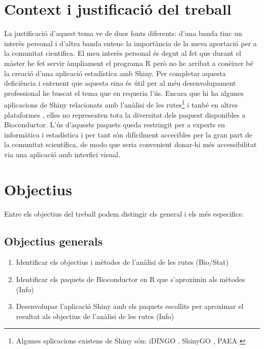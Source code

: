 \section{Context i justificació del treball}
La justificació d'aquest tema ve de dues fonts diferents: d'una banda tinc un interès personal i d'altra banda entenc la importància de la meva aportació per a la comunitat científica. El meu interès personal és degut al fet que durant el màster he fet servir àmpliament el programa R però no he arribat a conèixer bé la creació d'una aplicació estadística amb Shiny. Per completar aquesta deficiència i entenent que aquesta eina és útil per al méu desenvolupament professional he buscat el tema que en requeria l'ús. Encara que hi ha algunes aplicacions de Shiny relacionats amb l'anàlisi de les rutes\footnote{Algunes splicacions existens de Shiny són: iDINGO \cite{class2017idingo}, ShinyGO \cite{ge2018shinygo}, PAEA \cite{clark2015principle}} i tanbé en altres plataformes \cite{reimand2019pathway}, elles no representen tota la diversitat dels paquest disponibles a Bioconductor. L'ús d'aquests paquets queda restringit per a experts en informàtica i estadística i per tant són difícilment accecibles per la gran part de la comunitat scientífica, de modo que seria convenient donar-hi més accessibilitat via una aplicació amb interfici visual. 


\section{Objectius}

Entre els objectius del treball podem distingir els general i els més especifics:
 
\subsection{Objectius generals}
\begin{enumerate}
\item Identificar els objectius i mètodes de l'anàlisi de les rutes (Bio/Stat)
\item Identificar els paquets de Bioconductor en R que s'aproximin als mètodes (Info)
\item Desenvolupar l'aplicació Shiny  amb els paquets escollits per aproximar el resultat als objectius de l'anàlisi de les rutes  (Info)
\end{enumerate}

